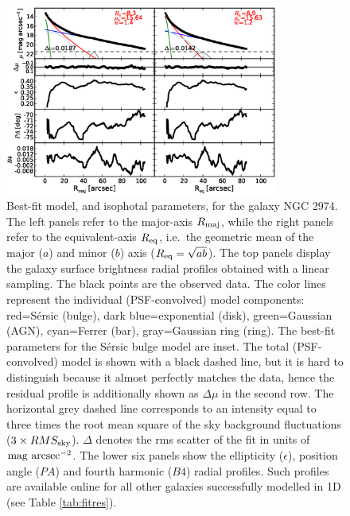 \documentclass[preprint2]{emulateapj}
\newcommand{\fitfigurewidth}{0.8\textwidth}
\begin{document}
\begin{figure}[h]
\begin{center}
\includegraphics[width=\fitfigurewidth]{n2974_1Dfit.eps}
\caption{Best-fit model, and isophotal parameters, for the galaxy NGC 2974. 
The left panels refer to the major-axis $R_{\rm maj}$, 
while the right panels refer to the equivalent-axis $R_{\rm eq}$, 
i.e.~the geometric mean of the major ($a$) and minor ($b$) axis ($R_{\rm eq} = \sqrt{ab}$).
The top panels display the galaxy surface brightness radial profiles obtained with a linear sampling. 
The black points are the observed data.  
The color lines represent the individual (PSF-convolved) model components:
red=S\'ersic (bulge), dark blue=exponential (disk), green=Gaussian (AGN), cyan=Ferrer (bar), gray=Gaussian ring (ring). 
The best-fit parameters for the S\'ersic bulge model are inset.
The total (PSF-convolved) model is shown with a black dashed line, 
but it is hard to distinguish because it almost perfectly matches the data, 
hence the residual profile is additionally shown as $\Delta \mu$ in the second row.
The horizontal grey dashed line corresponds to an intensity 
equal to three times the root mean square of the sky background fluctuations ($3 \times RMS_{\rm sky}$).
$\Delta$ denotes the rms scatter of the fit in units of $\rm mag~arcsec^{-2}$.
The lower six panels show the ellipticity ($\epsilon$), position angle ($PA$) and fourth harmonic ($B4$) radial profiles. 
Such profiles are available online for all other galaxies successfully modelled in 1D (see Table \ref{tab:fitres}).}
\label{fig:n2974ex}
\end{center}
\end{figure}
\end{document}
